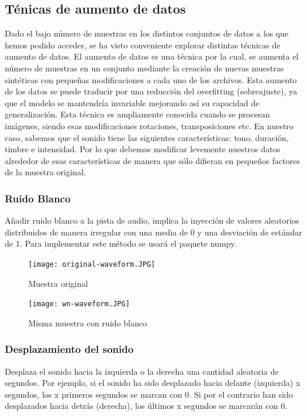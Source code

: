 \documentclass[11pt,a4paper,spanish]{book}
\begin{document}
	
	\subsection{Ténicas de aumento de datos}
	Dado el bajo número de muestras en los distintos conjuntos de datos a los que hemos podido acceder, se ha visto conveniente explorar distintas técnicas de aumento de datos. El aumento de datos es una técnica por la cual, se aumenta el número de muestras en un conjunto mediante la creación de nuevas muestras sintéticas con pequeñas modificaciones a cada uno de los archivos. Esta aumento de los datos se puede traducir por una reducción del overfitting (sobreajuste), ya que el modelo se mantendría invariable mejorando así su capacidad de generalización.
	Esta técnica es ampliamente conocida cuando se procesan imágenes, siendo esas modificaciones rotaciones, transposiciones etc. En nuestro caso, sabemos que el sonido tiene las siguientes características: tono, duración, timbre e intensidad. Por lo que debemos modificar levemente nuestros datos alrededor de esas características de manera que sólo difieran en pequeños factores de la muestra original.
	
		\subsubsection{Ruido Blanco}
		Añadir ruido blanco a la pista de audio, implica la inyección de valores aleatorios distribuidos de manera irregular con una media de 0 y una desviación de estándar de 1. Para implementar este método se usará el paquete numpy.
		
		\begin{figure}[!htb]
			\begin{minipage}{0.45\textwidth}
				\centering
				\texttt{[image: original-waveform.JPG]}
				\caption{Muestra original}
				\label{ref:audio_original_1}
			\end{minipage}\hfill 
			\begin{minipage}{0.45\textwidth}
				\centering
				\texttt{[image: wn-waveform.JPG]}\hfill
				\caption{Misma muestra con ruido blanco}
				\label{ref:audio_wn}
			\end{minipage}
		\end{figure}
				
				
		\subsubsection{Desplazamiento del sonido}
		Desplaza el sonido hacia la izquierda o la derecha una cantidad aleatoria de segundos. Por ejemplo, si el sonido ha sido desplazado hacia delante (izquierda) x segundos, los x primeros segundos se marcan con 0. Si por el contrario han sido desplazados hacia detrás (derecha), los últimos x segundos se marcarán con 0.
		
\end{document}
